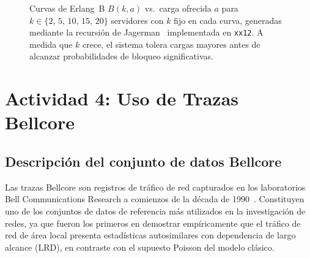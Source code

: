 \documentclass[12pt,a4paper]{article}
\theoremstyle{definition}
\theoremstyle{plain}
\theoremstyle{remark}
\begin{document}
\begin{figure}[H]
\centering
{}
\caption{Curvas de Erlang~B $B(k,a)$ vs.\ carga ofrecida $a$ para
$k \in \{2,\,5,\,10,\,15,\,20\}$ servidores con $k$ fijo en cada curva,
generadas mediante la recursión de Jagerman~\cite{jagerman1974} implementada
en \texttt{xx12}.
A medida que $k$ crece, el sistema tolera cargas mayores antes de alcanzar
probabilidades de bloqueo significativas.}
\label{fig:curvas_erlang}
\end{figure}
\section{Actividad 4: Uso de Trazas Bellcore}

\subsection*{Descripción del conjunto de datos Bellcore}

Las trazas Bellcore son registros de tráfico de red capturados en los laboratorios Bell
Communications Research a comienzos de la década de 1990~\cite{leland1994}.
Constituyen uno de los conjuntos de datos de referencia más utilizados en la investigación
de redes, ya que fueron los primeros en demostrar empíricamente que el tráfico de red de
área local presenta estadísticas autosimilares con dependencia de largo alcance (LRD),
en contraste con el supuesto Poisson del modelo clásico.
\end{document}
